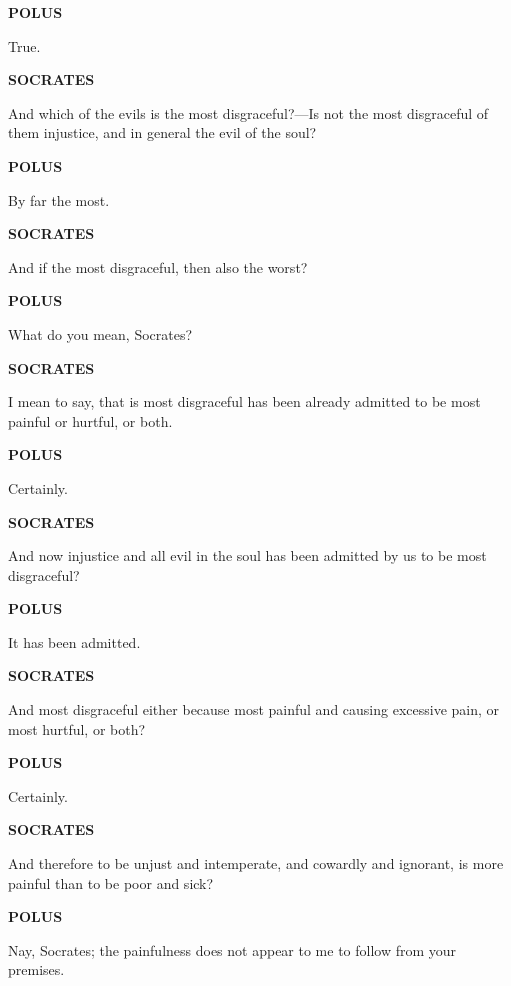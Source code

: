 \documentclass[11pt,letter]{article}
\begin{document}
\par \textbf{POLUS}
\par   True.

\par \textbf{SOCRATES}
\par   And which of the evils is the most disgraceful?—Is not the most disgraceful of them injustice, and in general the evil of the soul?

\par \textbf{POLUS}
\par   By far the most.

\par \textbf{SOCRATES}
\par   And if the most disgraceful, then also the worst?

\par \textbf{POLUS}
\par   What do you mean, Socrates?

\par \textbf{SOCRATES}
\par   I mean to say, that is most disgraceful has been already admitted to be most painful or hurtful, or both.

\par \textbf{POLUS}
\par   Certainly.

\par \textbf{SOCRATES}
\par   And now injustice and all evil in the soul has been admitted by us to be most disgraceful?

\par \textbf{POLUS}
\par   It has been admitted.

\par \textbf{SOCRATES}
\par   And most disgraceful either because most painful and causing excessive pain, or most hurtful, or both?

\par \textbf{POLUS}
\par   Certainly.

\par \textbf{SOCRATES}
\par   And therefore to be unjust and intemperate, and cowardly and ignorant, is more painful than to be poor and sick?

\par \textbf{POLUS}
\par   Nay, Socrates; the painfulness does not appear to me to follow from your premises.
\end{document}
